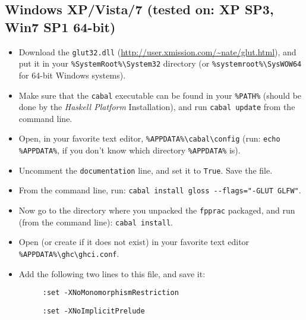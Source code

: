 \documentclass[]{article}
\begin{document}
\subsection{Windows XP/Vista/7 (tested on: XP SP3, Win7 SP1 64-bit)}
\begin{itemize}
  \item Download the \texttt{glut32.dll} (\url{http://user.xmission.com/~nate/glut.html}), and put it in your\newline{} \texttt{\%SystemRoot\%\textbackslash{}System32} directory (or \texttt{\%systemroot\%\textbackslash{}SysWOW64} for 64-bit Windows systems).
  \item Make sure that the \texttt{cabal} executable can be found in your \texttt{\%PATH\%} (should be done by the \emph{Haskell Platform} Installation), and run \texttt{cabal update} from the command line.
  \item Open, in your favorite text editor, \texttt{\%APPDATA\%\textbackslash{}cabal\textbackslash{}config} (run: \texttt{echo \%APPDATA\%}, if you don't know which directory \texttt{\%APPDATA\%} is).
  \item Uncomment the \texttt{documentation} line, and set it to \texttt{True}. Save the file.
  \item From the command line, run: \texttt{cabal install gloss -{}-flags="-GLUT GLFW"}.
  \item Now go to the directory where you unpacked the \texttt{fpprac} packaged, and run (from the command line): \texttt{cabal install}.
  \item Open (or create if it does not exist) in your favorite text editor \texttt{\%APPDATA\%\textbackslash{}ghc\textbackslash{}ghci.conf}.
  \item Add the following two lines to this file, and save it:
  \begin{description}
    \item[] \texttt{:set -XNoMonomorphismRestriction}
    \item[] \texttt{:set -XNoImplicitPrelude}
  \end{description}
\end{itemize}
\end{document}
